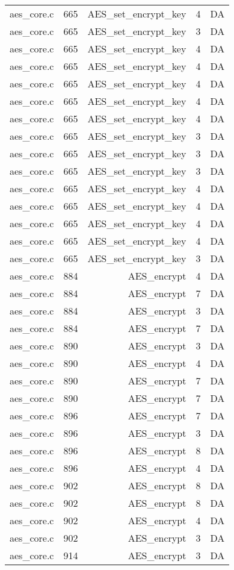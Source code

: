 \begin{table}[h]
{\begin{tabular}{clrrr}
aes\_core.c&665&AES\_set\_encrypt\_key&4 &DA\\
aes\_core.c&665&AES\_set\_encrypt\_key&3 &DA\\
aes\_core.c&665&AES\_set\_encrypt\_key&4 &DA\\
aes\_core.c&665&AES\_set\_encrypt\_key&4 &DA\\
aes\_core.c&665&AES\_set\_encrypt\_key&4 &DA\\
aes\_core.c&665&AES\_set\_encrypt\_key&4 &DA\\
aes\_core.c&665&AES\_set\_encrypt\_key&4 &DA\\
aes\_core.c&665&AES\_set\_encrypt\_key&3 &DA\\
aes\_core.c&665&AES\_set\_encrypt\_key&3 &DA\\
aes\_core.c&665&AES\_set\_encrypt\_key&3 &DA\\
aes\_core.c&665&AES\_set\_encrypt\_key&4 &DA\\
aes\_core.c&665&AES\_set\_encrypt\_key&4 &DA\\
aes\_core.c&665&AES\_set\_encrypt\_key&4 &DA\\
aes\_core.c&665&AES\_set\_encrypt\_key&4 &DA\\
aes\_core.c&665&AES\_set\_encrypt\_key&3 &DA\\
aes\_core.c&884&AES\_encrypt&4 &DA\\
aes\_core.c&884&AES\_encrypt&7 &DA\\
aes\_core.c&884&AES\_encrypt&3 &DA\\
aes\_core.c&884&AES\_encrypt&7 &DA\\
aes\_core.c&890&AES\_encrypt&3 &DA\\
aes\_core.c&890&AES\_encrypt&4 &DA\\
aes\_core.c&890&AES\_encrypt&7 &DA\\
aes\_core.c&890&AES\_encrypt&7 &DA\\
aes\_core.c&896&AES\_encrypt&7 &DA\\
aes\_core.c&896&AES\_encrypt&3 &DA\\
aes\_core.c&896&AES\_encrypt&8 &DA\\
aes\_core.c&896&AES\_encrypt&4 &DA\\
aes\_core.c&902&AES\_encrypt&8 &DA\\
aes\_core.c&902&AES\_encrypt&8 &DA\\
aes\_core.c&902&AES\_encrypt&4 &DA\\
aes\_core.c&902&AES\_encrypt&3 &DA\\
aes\_core.c&914&AES\_encrypt&3 &DA\\

\end{tabular}}
\end{table}
